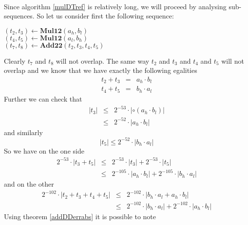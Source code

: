 \documentclass[a4paper,10pt,twoside]{article}
\newenvironment{proof}[1][Proof]{\begin{trivlist}
\item[\hskip \labelsep {\bfseries #1}]}{\end{trivlist}}
\newcommand{\hi}{\ensuremath{\mathit{h}}}
\newcommand{\lo}{\ensuremath{\mathit{l}}}
\newcommand{\mAddDD}{\ensuremath{\mathbf{Add22}}}
\newcommand{\mMul}{\ensuremath{\mathbf{Mul12}}}
\begin{document}
\begin{proof} ~ \\
Since algorithm \ref{mulDTref} is relatively long, we will proceed by analysing sub-sequences. So let us consider
first the following sequence:
\begin{center}
\begin{minipage}[b]{50mm}
$\left( t_2, t_3 \right) \gets \mMul\left( a_\hi, b_\lo \right)$ \\
$\left( t_4, t_5 \right) \gets \mMul\left( a_\lo, b_\hi \right)$ \\
$\left( t_7, t_8 \right) \gets \mAddDD\left( t_2, t_3, t_4, t_5 \right)$
\end{minipage}
\end{center}
Clearly $t_7$ and $t_8$ will not overlap. The same way $t_2$ and $t_3$ and $t_4$ and $t_5$ will not overlap and
we know that we have exactly the following egalities
\begin{eqnarray*}
t_2 + t_3 & = & a_\hi \cdot b_\lo \\
t_4 + t_5 & = & b_\hi \cdot a_\lo
\end{eqnarray*}
Further we can check that
\begin{eqnarray*}
\left \vert t_3 \right \vert & \leq & 2^{-53} \cdot \left \vert \circ \left( a_\hi \cdot b_\lo \right) \right \vert \\
& \leq & 2^{-52} \cdot \left \vert a_\hi \cdot b_\lo \right \vert
\end{eqnarray*}
and similarly
$$\left \vert t_5 \right \vert \leq 2^{-52} \cdot \left \vert b_\hi \cdot a_\lo \right \vert$$
So we have on the one side
\begin{eqnarray*}
2^{-53} \cdot \left \vert t_3 + t_5 \right \vert & \leq & 2^{-53} \cdot \left \vert t_3 \right \vert + 2^{-53} \cdot \left \vert t_5 \right \vert \\
& \leq & 2^{-105} \cdot \left \vert a_\hi \cdot b_\lo \right \vert + 2^{-105} \cdot \left \vert b_\hi \cdot a_\lo \right \vert
\end{eqnarray*}
and on the other
\begin{eqnarray*}
2^{-102} \cdot \left \vert t_2 + t_3 + t_4 + t_5 \right \vert & \leq & 2^{-102} \cdot \left \vert
                 b_\hi \cdot a_\lo + a_\hi \cdot b_\lo \right \vert \\
& \leq & 2^{-102} \cdot \left \vert b_\hi \cdot a_\lo \right \vert + 2^{-102} \cdot \left \vert a_\hi \cdot b_\lo \right \vert
\end{eqnarray*}
Using theorem \ref{addDDerrabs} it is possible to note

\end{proof}
\end{document}
